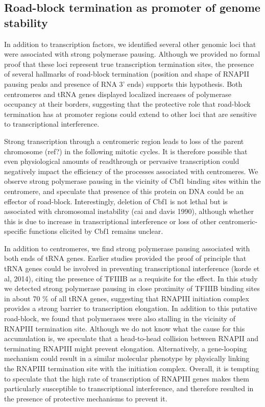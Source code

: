 \subsection{Road-block termination as promoter of genome stability}

In addition to transcription factors, we identified several other genomic loci that were associated with strong polymerase pausing. 
Although we provided no formal proof that these loci represent true transcription termination sites, the presence of several hallmarks of road-block termination (position and shape of RNAPII pausing peaks and presence of RNA 3’ ends) supports this hypothesis. 
Both centromeres and tRNA genes displayed localized increases of polymerase occupancy at their borders, suggesting that the protective role that road-block termination has at promoter regions could extend to other loci that are sensitive to transcriptional interference. 

Strong transcription through a centromeric region leads to loss of the parent chromosome (ref?) in the following mitotic cycles. 
It is therefore possible that even physiological amounts of readthrough or pervasive transcription could negatively impact the efficiency of the processes associated with centromeres. 
We observe strong polymerase pausing in the vicinity of Cbf1 binding sites within the centromere, and speculate that presence of this protein on DNA could be an effector of road-block. 
Interestingly, deletion of Cbf1 is not lethal but is associated with chromosomal instability (cai and davis 1990), although whether this is due to increase in transcriptional interference or loss of other centromeric-specific functions elicited by Cbf1 remains unclear.

In addition to centromeres, we find strong polymerase pausing associated with both ends of tRNA genes. 
Earlier studies provided the proof of principle that tRNA genes could be involved in preventing transcriptional interference (korde et al, 2014), citing the presence of TFIIIB as a requisite for the effect. 
In this study we detected strong polymerase pausing in close proximity of TFIIIB binding sites in about 70 \% of all tRNA genes, suggesting that RNAPIII initiation complex provides a strong barrier to transcription elongation. 
In addition to this putative road-block, we found that polymerases were also stalling in the vicinity of RNAPIII termination site. 
Although we do not know what the cause for this accumulation is, we speculate that a head-to-head collision between RNAPII and terminating RNAPIII might prevent elongation. 
Alternatively, a gene-looping mechanism could result in a similar molecular phenotype by physically linking the RNAPIII termination site with the initiation complex. Overall, it is tempting to speculate that the high rate of transcription of RNAPIII genes makes them particularly susceptible to transcriptional interference, and therefore resulted in the presence of protective mechanisms to prevent it.
